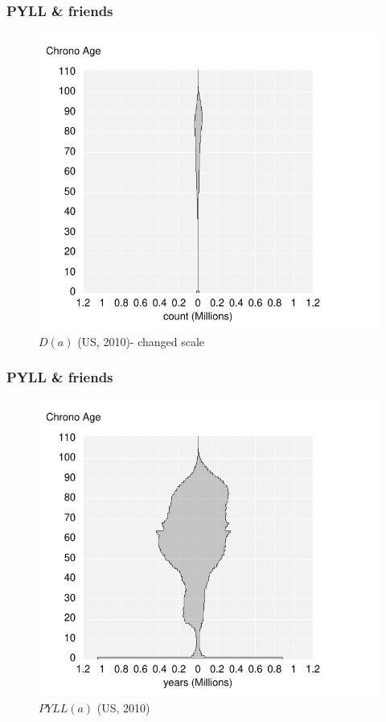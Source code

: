 \documentclass{beamer}
\begin{document}
\begin{frame}
\frametitle{PYLL \& friends}
\vspace{-1cm}
\begin{figure}[b]
    \centering
    \includegraphics[scale=.7]{Figures/f4_Da.pdf}
    \caption{$D(a)$ (US, 2010)- changed scale}
\end{figure} 
\end{frame}
\begin{frame}
\frametitle{PYLL \& friends}
\vspace{-1cm}
\begin{figure}[b]
    \centering
    \includegraphics[scale=.7]{Figures/f5_Daea.pdf}
    \caption{$PYLL(a)$ (US, 2010)}
\end{figure} 
\end{frame}
\end{document}
